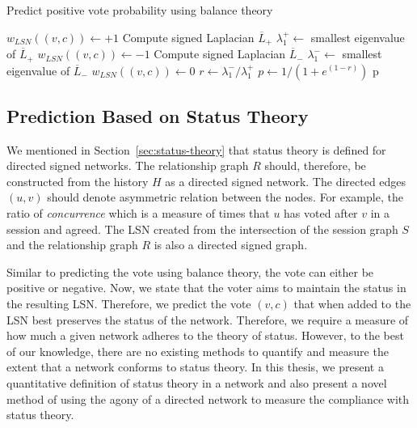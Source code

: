 \begin{algorithm}[htp]
    \DontPrintSemicolon
    \caption{Predict positive vote probability using balance theory}
    \label{alg:balance-pred}
    $w_{LSN}((v,c)) \leftarrow +1$ 
    Compute signed Laplacian $\overline{L}_+$\;
    $\lambda_1^+ \leftarrow $ smallest eigenvalue of $\overline{L}_+$\;
    $w_{LSN}((v,c)) \leftarrow -1$  
    Compute signed Laplacian $\overline{L}_-$\;
    $\lambda_{1}^- \leftarrow$ smallest eigenvalue of $\overline{L}_-$\;
    $w_{LSN}((v,c)) \leftarrow 0$ 
    $r \leftarrow {\lambda_{1}^-}/{\lambda_{1}^{+}}$\;
    $p \leftarrow 1/(1+e^{(1-r)})$\;
    \Return p
\end{algorithm}

\subsection{Prediction Based on Status Theory }
\label{subsec:prediction-based-status}
We mentioned in Section~\ref{sec:status-theory} that status theory is defined for directed signed networks.
The relationship graph $R$ should, therefore, be constructed from the history $H$ as a directed signed network.
The directed edges $(u,v)$ should denote asymmetric relation between the nodes.
For example, the ratio of \textit{concurrence} which is a measure of times that $u$ has voted after $v$ in a session and agreed.
The LSN created from the intersection of the session graph $S$ and the relationship graph $R$ is also a directed signed graph.

Similar to predicting the vote using balance theory, the vote can either be positive or negative.
Now, we state that the voter aims to maintain the status in the resulting LSN.
Therefore, we predict the vote $(v,c)$ that when added to the LSN best preserves the status of the network.
Therefore, we require a measure of how much a given network adheres to the theory of status.
However, to the best of our knowledge, there are no existing methods to quantify and measure the extent that a network conforms to status theory.
In this thesis, we present a quantitative definition of status theory in a network and also present a novel method of using the agony of a directed network to measure the compliance with status theory.


